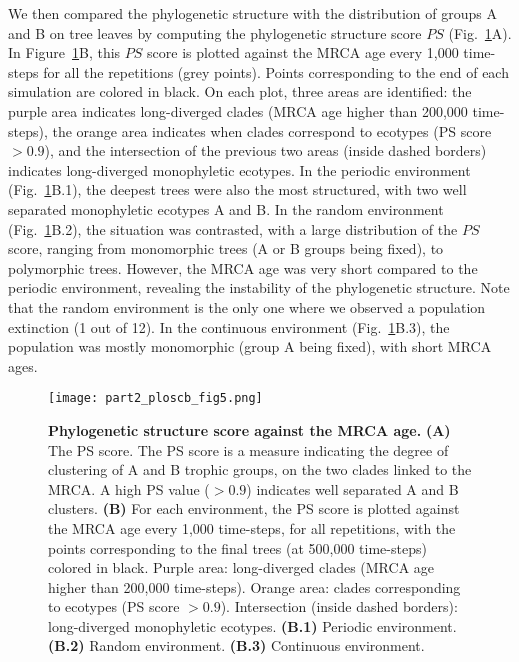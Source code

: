 We then compared the phylogenetic structure with the distribution of groups A and B on tree leaves by computing the phylogenetic structure score $PS$ (Fig.~\ref{fig:part2:first_result:Fig5}A).
In Figure~\ref{fig:part2:first_result:Fig5}B, this $PS$ score is plotted against the MRCA age every 1,000 time-steps for all the repetitions (grey points). Points corresponding to the end of each simulation are colored in black. On each plot, three areas are identified: the purple area indicates long-diverged clades (MRCA age higher than 200,000 time-steps), the orange area indicates when clades correspond to ecotypes (PS score $> 0.9$), and the intersection of the previous two areas (inside dashed borders) indicates long-diverged monophyletic ecotypes. In the periodic environment (Fig.~\ref{fig:part2:first_result:Fig5}B.1), the deepest trees were also the most structured, with two well separated monophyletic ecotypes A and B. In the random environment (Fig.~\ref{fig:part2:first_result:Fig5}B.2), the situation was contrasted, with a large distribution of the $PS$ score, ranging from monomorphic trees (A or B groups being fixed), to polymorphic trees. However, the MRCA age was very short compared to the periodic environment, revealing the instability of the phylogenetic structure. Note that the random environment is the only one where we observed a population extinction (1 out of 12). In the continuous environment (Fig.~\ref{fig:part2:first_result:Fig5}B.3), the population was mostly monomorphic (group A being fixed), with short MRCA ages.

\begin{figure}[!h]
\centering
\texttt{[image: part2\_ploscb\_fig5.png]}
\caption[Phylogenetic structure score against the MRCA age.]{{\bf Phylogenetic structure score against the MRCA age.} {\bf (A)} The PS score. The PS score is a measure indicating the degree of clustering of A and B trophic groups, on the two clades linked to the MRCA. A high PS value ($> 0.9$) indicates well separated A and B clusters. {\bf (B)} For each environment, the PS score is plotted against the MRCA age every 1,000 time-steps, for all repetitions, with the points corresponding to the final trees (at 500,000 time-steps) colored in black. Purple area: long-diverged clades (MRCA age higher than 200,000 time-steps). Orange area: clades corresponding to ecotypes (PS score $> 0.9$). Intersection (inside dashed borders): long-diverged monophyletic ecotypes. {\bf (B.1)} Periodic environment. {\bf (B.2)} Random environment. {\bf (B.3)} Continuous environment.}
\label{fig:part2:first_result:Fig5}
\end{figure}

